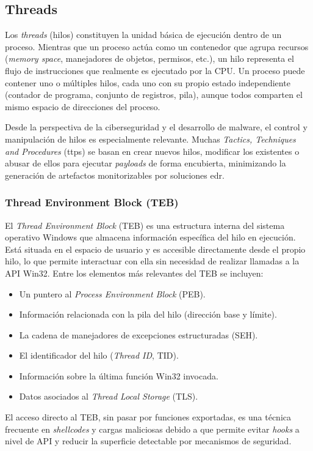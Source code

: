 \subsection{Threads}

Los \textit{threads} (hilos) constituyen la unidad básica de ejecución dentro de un proceso. Mientras que un proceso actúa como un contenedor que agrupa recursos (\textit{memory space}, manejadores de objetos, permisos, etc.), un hilo representa el flujo de instrucciones que realmente es ejecutado por la CPU.  
Un proceso puede contener uno o múltiples hilos, cada uno con su propio estado independiente (contador de programa, conjunto de registros, pila), aunque todos comparten el mismo espacio de direcciones del proceso.

Desde la perspectiva de la ciberseguridad y el desarrollo de malware, el control y manipulación de hilos es especialmente relevante. Muchas \textit{Tactics, Techniques and Procedures} (\acrshort{ttp}s) se basan en crear nuevos hilos, modificar los existentes o abusar de ellos para ejecutar \textit{payloads} de forma encubierta, minimizando la generación de artefactos monitorizables por soluciones \acrshort{edr}.

\subsubsection{Thread Environment Block (TEB)}

El \textit{Thread Environment Block} (TEB) es una estructura interna del sistema operativo Windows que almacena información específica del hilo en ejecución. Está situada en el espacio de usuario y es accesible directamente desde el propio hilo, lo que permite interactuar con ella sin necesidad de realizar llamadas a la API Win32. Entre los elementos más relevantes del TEB se incluyen:

\begin{itemize}
    \item Un puntero al \textit{Process Environment Block} (PEB).
    \item Información relacionada con la pila del hilo (dirección base y límite).
    \item La cadena de manejadores de excepciones estructuradas (SEH).
    \item El identificador del hilo (\textit{Thread ID}, TID).
    \item Información sobre la última función Win32 invocada.
    \item Datos asociados al \textit{Thread Local Storage} (TLS).
\end{itemize}

El acceso directo al TEB, sin pasar por funciones exportadas, es una técnica frecuente en \textit{shellcodes} y cargas maliciosas debido a que permite evitar \textit{hooks} a nivel de API y reducir la superficie detectable por mecanismos de seguridad.